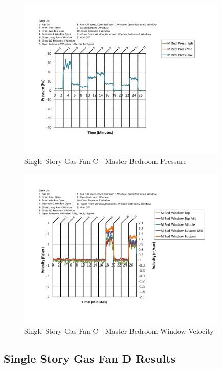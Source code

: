 \documentclass{article}
\begin{document}
\begin{appendices}
	\begin{figure}[H]
		\centering
		\includegraphics[height=3.05in,trim=0.67in 1.1in 0.67in 0.8in,clip=true]{0_Images/Results_Charts/ColdFlow/Single_Story/Gas/C/Master_Bedroom_Pressure.pdf}
		\caption{Single Story Gas Fan C - Master Bedroom Pressure}
	\end{figure}
 

	\begin{figure}[H]
		\centering
		\includegraphics[height=3.05in,trim=0.67in 1.1in 0.67in 0.8in,clip=true]{0_Images/Results_Charts/ColdFlow/Single_Story/Gas/C/Master_Bedroom_Window_Velocity.pdf}
		\caption{Single Story Gas Fan C - Master Bedroom Window Velocity}
	\end{figure}
 
	\clearpage

		\clearpage
\clearpage		\large
\subsection{Single Story Gas Fan D Results} \label{App:Single_StoryGasFanDResults} 


\end{appendices}
\end{document}
